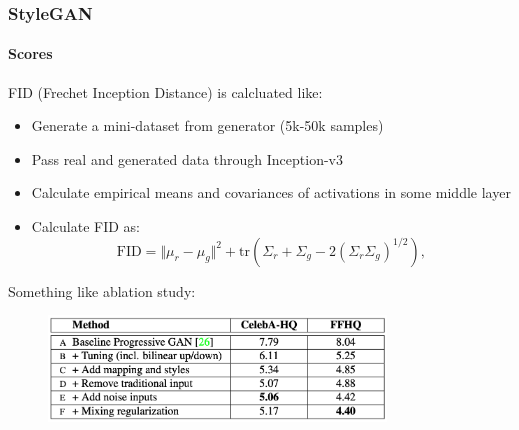 \documentclass[10pt]{beamer}
\begin{document}
\begin{frame}
\frametitle{StyleGAN}
\framesubtitle{Scores}
FID (Frechet Inception Distance) is calcluated like:
\begin{itemize}
    \item Generate a mini-dataset from generator (5k-50k samples)
    \item Pass real and generated data through Inception-v3
    \item Calculate empirical means and covariances of activations in some middle layer
    \item Calculate FID as:
\[
\text{FID} = \Vert\mu_r - \mu_g\Vert^2 + \text{tr} (\Sigma_r + \Sigma_g - 2 (\Sigma_r \Sigma_g)^{1/2}),
\]
\end{itemize}

Something like ablation study:
\begin{figure}
\centering
\includegraphics[width=0.8\textwidth]{images/stylegan-scores}
\end{figure}

\end{frame}
\end{document}
